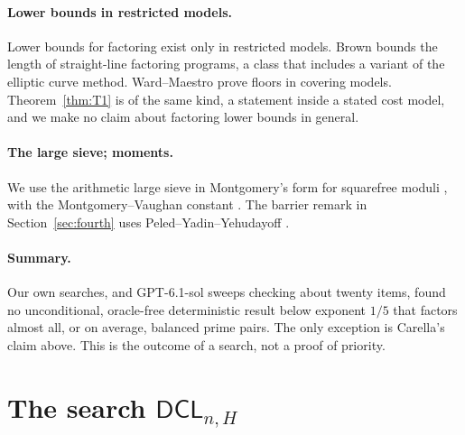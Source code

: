 \documentclass[11pt]{amsart}
\theoremstyle{definition}
\newcommand{\DCL}{\textsf{DCL}}
\begin{document}
\paragraph{Lower bounds in restricted models.}
Lower bounds for factoring exist only in restricted models. Brown \cite{brown2010} bounds the
length of straight-line factoring programs, a class that includes a variant of the elliptic
curve method. Ward--Maestro prove floors in covering models. Theorem~\ref{thm:T1} is of the same
kind, a statement inside a stated cost model, and we make no claim about factoring lower bounds in
general.

\paragraph{The large sieve; moments.}
We use the arithmetic large sieve in Montgomery's form for squarefree moduli
\cite{montgomery1968}, with the Montgomery--Vaughan constant \cite{mv1973}. The barrier remark
in Section~\ref{sec:fourth} uses Peled--Yadin--Yehudayoff \cite{pyy2011}.

\paragraph{Summary.}
Our own searches, and GPT-6.1-sol sweeps checking about twenty items, found no unconditional,
oracle-free deterministic result below exponent $1/5$ that factors almost all, or on average,
balanced prime pairs. The only exception is Carella's claim above. This is the outcome of a
search, not a proof of priority.

\section{The search \texorpdfstring{$\DCL_{n,H}$}{DCL}}\label{sec:alg}
\end{document}
